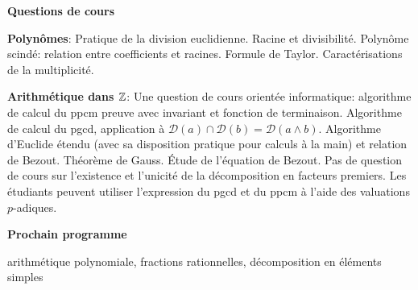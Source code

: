 \begin{parcolumns}[rulebetween,distance=\parcoldist]{2}

  \colplacechunks

  \colchunk{}
  \colplacechunks

  \colchunk{}
  \colplacechunks

  \colchunk{}
  \colplacechunks
\end{parcolumns}




\bigskip
\begin{center}
 \textbf{Questions de cours}
 \end{center}
 \textbf{Polynômes}:\newline
Pratique de la division euclidienne. Racine et divisibilité. Polynôme scindé: relation entre coefficients et racines. Formule de Taylor.
Caractérisations de la multiplicité.

 \textbf{Arithmétique dans $\mathbb{Z}$}:\newline
Une question de cours orientée informatique: algorithme de calcul du ppcm preuve avec invariant et fonction de terminaison.\newline
Algorithme de calcul du pgcd, application à $\mathcal{D}(a)\cap \mathcal{D}(b) = \mathcal{D}(a\wedge b)$.\newline
Algorithme d'Euclide étendu (avec sa disposition pratique pour calculs à la main) et relation de Bezout.\newline
Théorème de Gauss. \newline
\'Etude de l'équation de Bezout. \newline
Pas de question de cours sur l'existence et l'unicité de la décomposition en facteurs premiers. Les étudiants peuvent utiliser l'expression du pgcd et du ppcm à l'aide des valuations $p$-adiques.\newline

\begin{center}
 \textbf{Prochain programme}
\end{center}
arithmétique polynomiale, fractions rationnelles, décomposition en éléments simples

